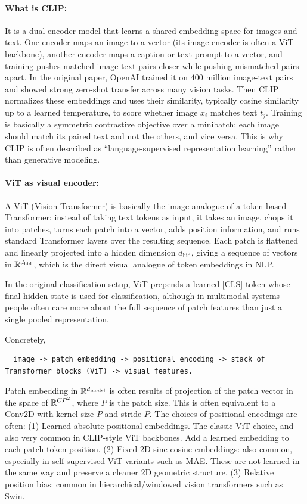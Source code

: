 \documentclass[11pt]{article}  %
\begin{document}
\paragraph{What is CLIP:}
It is a dual-encoder model that learns a shared embedding space for images and text.
One encoder maps an image to a vector (its image encoder is often a ViT backbone), another encoder maps a caption or text prompt to a vector, and training pushes matched image-text pairs closer while pushing mismatched pairs apart.
In the original paper, OpenAI trained it on $400$ million image-text pairs and showed strong zero-shot transfer across many vision tasks.
Then CLIP normalizes these embeddings and uses their similarity, typically cosine similarity up to a learned temperature, to score whether image $x_i$ matches text $t_j$.
Training is basically a symmetric contrastive objective over a minibatch: each image should match its paired text and not the others, and vice versa.
This is why CLIP is often described as ``language-supervised representation learning'' rather than generative modeling.


\paragraph{ViT as visual encoder:}
A ViT (Vision Transformer) is basically the image analogue of a token-based Transformer: instead of taking text tokens as input, it takes an image, chops it into patches, turns each patch into a vector, adds position information, and runs standard Transformer layers over the resulting sequence.
Each patch is flattened and linearly projected into a hidden dimension $d_{\text{hid}}$, giving a sequence of vectors in $\mathbb{R}^{d_{\text{hid}}}$, which is the direct visual analogue of token embeddings in NLP.

In the original classification setup, ViT prepends a learned [CLS] token whose final hidden state is used for classification, although in multimodal systems people often care more about the full sequence of patch features than just a single pooled representation.

Concretely, 
\begin{lstlisting}
  image -> patch embedding -> positional encoding -> stack of Transformer blocks (ViT) -> visual features.
\end{lstlisting}
Patch embedding in $\mathbb{R}^{d_{\text{model}}}$ is often results of projection of the patch vector in the space of $\mathbb{R}^{CP^2}$, where $P$ is the patch size.
This is often equivalent to a Conv2D with kernel size $P$ and stride $P$.
The choices of positional encodings are often: (1) Learned absolute positional embeddings. The classic ViT choice, and also very common in CLIP-style ViT backbones. Add a learned embedding to each patch token position.
(2) Fixed 2D sine-cosine embeddings: also common, especially in self-supervised ViT variants such as MAE. These are not learned in the same way and preserve a cleaner 2D geometric structure.
(3) Relative position bias: common in hierarchical/windowed vision transformers such as Swin.
\end{document}
